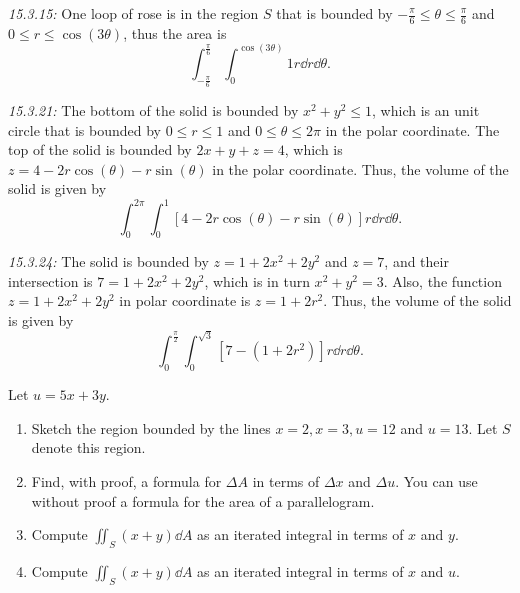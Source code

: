 \documentclass[8pt,twocolumn]{article}
\begin{document}
\begin{Answer}[number=13]
  \emph{15.3.15:} One loop of rose is in the region $S$ that is bounded by
  $-\frac{\pi}{6}\le\theta\le\frac{\pi}{6}$ and $0\le r\le\cos(3\theta)$, thus
  the area is
  \[\int_{-\frac{\pi}{6}}^{\frac{\pi}{6}}\int_0^{\cos(3\theta)}1 r\dd{r}\dd{\theta}.\]

  \emph{15.3.21:} The bottom of the solid is bounded by $x^2+y^2\le1$, which is
  an unit circle that is bounded by $0\le r\le 1$ and $0\le\theta\le2\pi$ in
  the polar coordinate. The top of the solid is bounded by $2x+y+z=4$, which is
  $z=4-2r\cos(\theta)-r\sin(\theta)$ in the polar coordinate. Thus, the volume
  of the solid is given by
  \[
    \int_0^{2\pi}\int_0^1 [4-2r\cos(\theta)-r\sin(\theta)] r \dd{r}
    \dd{\theta}.
  \]

  \emph{15.3.24:} The solid is bounded by $z=1+2x^2+2y^2$ and $z=7$, and their
  intersection is $7=1+2x^2+2y^2$, which is in turn $x^2+y^2=3$. Also, the
  function $z=1+2x^2+2y^2$ in polar coordinate is $z=1+2r^2$. Thus, the volume
  of the solid is given by
  \[
    \int_0^{\frac{\pi}{2}}\int_0^{\sqrt{3}}[7-(1+2r^2)]r\dd{r}\dd{\theta}.
  \]
\end{Answer}

\begin{Exercise}[number=14]
  Let $u = 5x + 3y$.
  \begin{enumerate}
    \item Sketch the region bounded by the lines $x=2, x=3, u=12$ and $u=13$.
      Let $S$ denote this region.
    \item Find, with proof, a formula for $\Delta A$ in terms of $\Delta x$ and
      $\Delta u$. You can use without proof a formula for the area of a
      parallelogram.
    \item Compute $\iint_S (x+y) \dd{A}$ as an iterated integral in terms of
      $x$ and $y$.
    \item Compute $\iint_S (x+y) \dd{A}$ as an iterated integral in terms of
      $x$ and $u$.
  \end{enumerate}
\end{Exercise}
\end{document}
